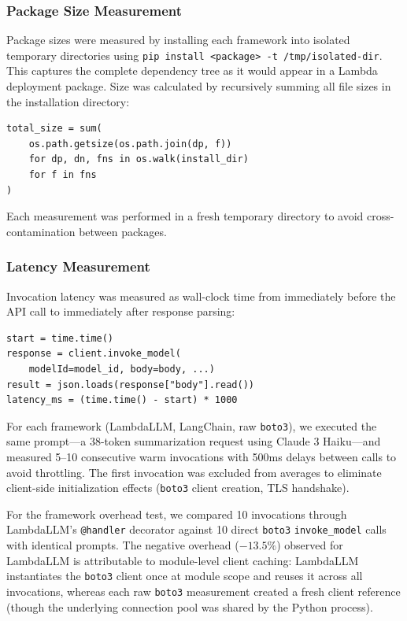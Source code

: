 \documentclass[10pt,twocolumn,letterpaper]{article}
\begin{document}
\subsubsection{Package Size Measurement}

Package sizes were measured by installing each framework into isolated temporary directories using \texttt{pip install <package> -t /tmp/isolated-dir}. This captures the complete dependency tree as it would appear in a Lambda deployment package. Size was calculated by recursively summing all file sizes in the installation directory:

\begin{lstlisting}
total_size = sum(
    os.path.getsize(os.path.join(dp, f))
    for dp, dn, fns in os.walk(install_dir)
    for f in fns
)
\end{lstlisting}

Each measurement was performed in a fresh temporary directory to avoid cross-contamination between packages.

\subsubsection{Latency Measurement}

Invocation latency was measured as wall-clock time from immediately before the API call to immediately after response parsing:

\begin{lstlisting}
start = time.time()
response = client.invoke_model(
    modelId=model_id, body=body, ...)
result = json.loads(response["body"].read())
latency_ms = (time.time() - start) * 1000
\end{lstlisting}

For each framework (LambdaLLM, LangChain, raw \texttt{boto3}), we executed the same prompt---a 38-token summarization request using Claude 3 Haiku---and measured 5--10 consecutive warm invocations with 500ms delays between calls to avoid throttling. The first invocation was excluded from averages to eliminate client-side initialization effects (\texttt{boto3} client creation, TLS handshake).

For the framework overhead test, we compared 10 invocations through LambdaLLM's \texttt{@handler} decorator against 10 direct \texttt{boto3} \texttt{invoke\_model} calls with identical prompts. The negative overhead ($-13.5\%$) observed for LambdaLLM is attributable to module-level client caching: LambdaLLM instantiates the \texttt{boto3} client once at module scope and reuses it across all invocations, whereas each raw \texttt{boto3} measurement created a fresh client reference (though the underlying connection pool was shared by the Python process).
\end{document}
